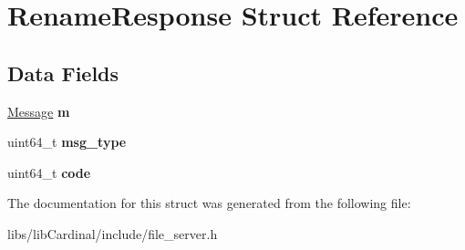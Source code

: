 \hypertarget{structRenameResponse}{}\section{Rename\+Response Struct Reference}
\label{structRenameResponse}
\subsection*{Data Fields}
\begin{DoxyCompactItemize}
\item 
\hyperlink{structMessage}{Message} {\bfseries m}\hypertarget{structRenameResponse_a10cb084e853003f59e648381112a3734}{}\label{structRenameResponse_a10cb084e853003f59e648381112a3734}

\item 
uint64\+\_\+t {\bfseries msg\+\_\+type}\hypertarget{structRenameResponse_ab2be11042de570dcc89a06b6c5034576}{}\label{structRenameResponse_ab2be11042de570dcc89a06b6c5034576}

\item 
uint64\+\_\+t {\bfseries code}\hypertarget{structRenameResponse_a995e5f82fea9df62f44a774f48b0609f}{}\label{structRenameResponse_a995e5f82fea9df62f44a774f48b0609f}

\end{DoxyCompactItemize}


The documentation for this struct was generated from the following file\+:\begin{DoxyCompactItemize}
\item 
libs/lib\+Cardinal/include/file\+\_\+server.\+h\end{DoxyCompactItemize}
